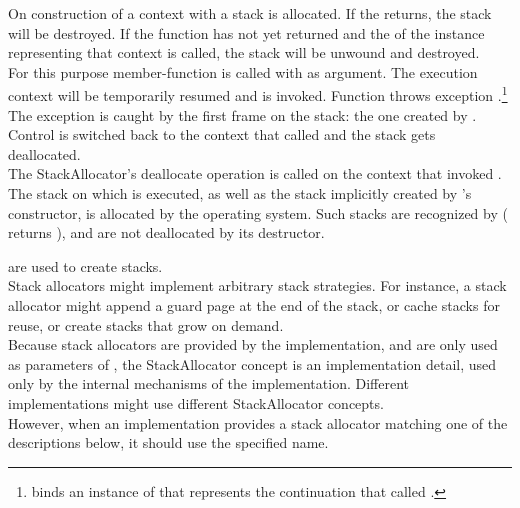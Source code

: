 \label{subsec:destruction}
On construction of a context with \callcc a stack is allocated. If the
\entryfn returns, the stack will be destroyed. If the function has not
yet returned and the  of the \cont instance
representing that context is called, the stack will be unwound and destroyed.\\

For this purpose member-function \resumewith is called with \unwindcont
as argument. The execution context will be temporarily
resumed and \unwindcont is invoked. Function \unwindcont throws exception
\unwindex.\footnote{\unwindex binds an instance of \cont that represents the
continuation that called \resumewith.} The exception
is caught by the first frame on the stack: the one created by
\callcc. Control is switched back to the context that called
\dtor and the stack gets deallocated.\\

The StackAllocator's deallocate operation is called on the context that
invoked \dtor.\\

The stack on which  is executed, as well as the stack implicitly
created by 's constructor, is allocated by the operating
system. Such stacks are recognized by \cont (\anythread
returns ), and are not deallocated by its destructor.


\label{subsec:stackalloc}
are used to create stacks.\\

Stack allocators might implement arbitrary stack strategies. For instance, a
stack allocator might append a guard page at the end of the stack, or cache
stacks for reuse, or create stacks that grow on demand.\\

Because stack allocators are provided by the implementation, and are only used
as parameters of \callcc, the StackAllocator concept is an implementation detail,
used only by the internal mechanisms of the \cc implementation. Different
implementations might use different StackAllocator concepts.\\

However, when an implementation provides a stack allocator matching one of
the descriptions below, it should use the specified name.\\

